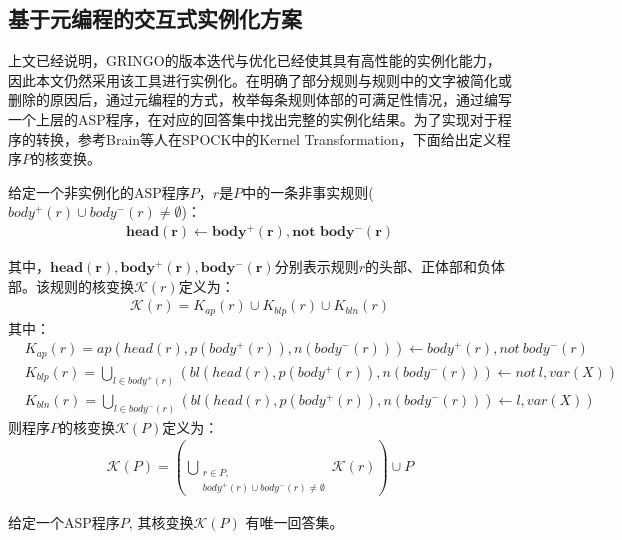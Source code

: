 \subsection{基于元编程的交互式实例化方案}
    上文已经说明，\textsf{GRINGO}的版本迭代与优化已经使其具有高性能的实例化能力，因此本文仍然采用该工具进行实例化。在明确了部分规则与规则中的文字被简化或删除的原因后，通过元编程的方式，枚举每条规则体部的可满足性情况，通过编写一个上层的ASP程序，在对应的回答集中找出完整的实例化结果。为了实现对于程序的转换，参考Brain等人在\textsf{SPOCK}中的Kernel Transformation，下面给出定义程序$P$的核变换。

    \begin{definition}
        给定一个非实例化的ASP程序$P$，$r$是$P$中的一条非事实规则($body^+(r) \cup body^-(r) \neq \emptyset$)：
        \begin{align}
            \mathbf{head(r)} \leftarrow \mathbf{  body^+(r), \text{not } body^-(r)} 
        \end{align}
        
        其中，$\mathbf{head(r), body^+(r), body^-(r)}$分别表示规则$r$的头部、正体部和负体部。该规则的核变换$\mathcal{K}(r)$定义为：
        \begin{align}
            \mathcal{K}(r)= K_{ap}(r) \cup K_{blp}(r) \cup K_{bln}(r)
        \end{align}
        其中：
        \begin{align}
            &K_{ap}(r)=ap(head(r), p(body^+(r)), n(body^-(r))) \leftarrow body^+(r), not\ body^-(r) \label{eq:kap}\\
            &K_{blp}(r)=\bigcup\limits_{{l \in body^+(r)}} \left(bl(head(r), p(body^+(r)), n(body^-(r)))\leftarrow not\ l, var(X) \right) \label{eq:blp}\\
            &K_{bln}(r)=\bigcup\limits_{{l \in body^-(r)}} \left(bl(head(r), p(body^+(r)), n(body^-(r)))\leftarrow l, var(X) \right) \label{eq:bln}
        \end{align}
        则程序$P$的核变换$\mathcal{K}(P)$定义为：
        \begin{align}
            \mathcal{K}(P) = \left( \bigcup_{\substack{r \in P,\\body^+(r) \cup body^-(r) \neq \emptyset}}\mathcal{K}(r) \right) \cup P
        \end{align}
    \end{definition}

    \begin{theorem}[程序的核变换有且仅有一个回答集]
        \label{thm:kernel}
        给定一个ASP程序$P$, 其核变换$\mathcal{K}(P)$ 有唯一回答集。
    \end{theorem}

